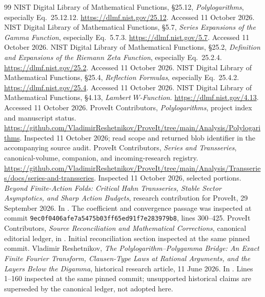 \documentclass[11pt,a4paper]{article}
\numberwithin{equation}{section}
\theoremstyle{definition}\newtheorem{definition}[theorem]{Definition}
\theoremstyle{remark}\newtheorem{remark}[theorem]{Remark}
\begin{document}
\begin{thebibliography}{99}
NIST Digital Library of Mathematical Functions,
\S25.12, \emph{Polylogarithms}, especially Eq.~25.12.12.
\url{https://dlmf.nist.gov/25.12}. Accessed 11 October 2026.
NIST Digital Library of Mathematical Functions,
\S5.7, \emph{Series Expansions of the Gamma Function}, especially
Eq.~5.7.3. \url{https://dlmf.nist.gov/5.7}.
Accessed 11 October 2026.
NIST Digital Library of Mathematical Functions,
\S25.2, \emph{Definition and Expansions of the Riemann Zeta Function},
especially Eq.~25.2.4. \url{https://dlmf.nist.gov/25.2}.
Accessed 11 October 2026.
NIST Digital Library of Mathematical Functions,
\S25.4, \emph{Reflection Formulas}, especially Eq.~25.4.2.
\url{https://dlmf.nist.gov/25.4}. Accessed 11 October 2026.
NIST Digital Library of Mathematical Functions,
\S4.13, \emph{Lambert $W$-Function}.
\url{https://dlmf.nist.gov/4.13}. Accessed 11 October 2026.
ProveIt Contributors, \emph{Polylogarithms}, project index and manuscript
status. \url{https://github.com/VladimirReshetnikov/ProveIt/tree/main/Analysis/Polylogarithms}.
Inspected 11 October 2026; read scope and returned blob identifier in the
accompanying source audit.
ProveIt Contributors, \emph{Series and Transseries}, canonical-volume,
companion, and incoming-research registry.
\url{https://github.com/VladimirReshetnikov/ProveIt/tree/main/Analysis/Transseries/docs/series-and-transseries}.
Inspected 11 October 2026, selected portions.
\emph{Beyond Finite-Action Folds: Critical Hahn Transseries, Stable Sector
Asymptotics, and Sharp Action Budgets}, research contribution for ProveIt,
29 September 2026. In
.
The coefficient and convergence passage was inspected at commit
\texttt{9ec0f0406afe7a5475b03ff65ed91f7e283979b8}, lines 300--425.
ProveIt Contributors, \emph{Source Reconciliation and Mathematical
Corrections}, canonical editorial ledger, in
.
Initial reconciliation section inspected at the same pinned commit.
Vladimir Reshetnikov, \emph{The Polylogarithm--Polygamma Bridge: An Exact
Finite Fourier Transform, Clausen-Type Laws at Rational Arguments, and
the Layers Below the Digamma}, historical research article, 11 June 2026.
In .
Lines 1--160 inspected at the same pinned commit; unsupported historical
claims are superseded by the canonical ledger, not adopted here.
\end{thebibliography}
\end{document}
